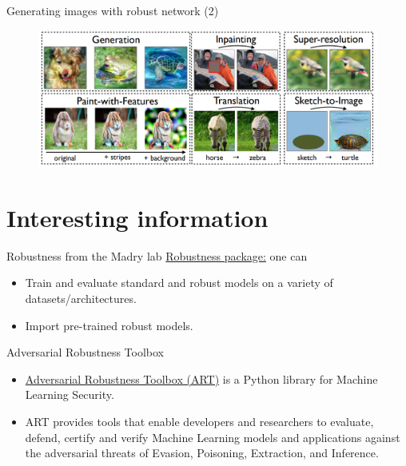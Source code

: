 \documentclass{beamer}
\begin{document}
\begin{frame}{Generating images with robust network (2)}
    \begin{figure}
    \includegraphics[width=1.\textwidth]{images/generation_with_robust_classifier.PNG}
    \caption{\cite{santurkar2019image}}
    \end{figure}
\end{frame}

\section{Interesting information}
\begin{frame}{Robustness from the Madry lab}
\href{https://github.com/MadryLab/robustness}{Robustness package:}
one can
\begin{itemize}
    \item Train and evaluate standard and robust models on a variety of datasets/architectures.
    \item Import pre-trained robust models.
\end{itemize}
\end{frame}

\begin{frame}{Adversarial Robustness Toolbox}
    \begin{itemize}
        \item \href{https://github.com/Trusted-AI/adversarial-robustness-toolbox}{Adversarial Robustness Toolbox (ART)} is a Python library for Machine Learning Security.
        \item ART provides tools that enable developers and researchers to evaluate, defend, certify and verify Machine Learning models and applications against the adversarial threats of Evasion, Poisoning, Extraction, and Inference.
    \end{itemize}
\end{frame}
\end{document}
